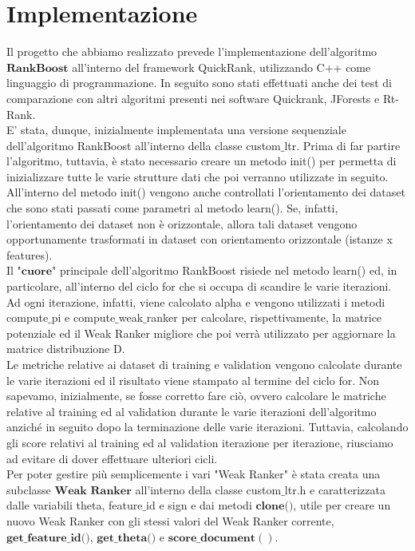 \chapter*{Implementazione}

Il progetto che abbiamo realizzato prevede l'implementazione dell'algoritmo $\textbf{RankBoost}$ all'interno del framework QuickRank, utilizzando C++ come linguaggio di programmazione. In seguito sono stati effettuati anche dei test di comparazione con altri algoritmi presenti nei software Quickrank, JForests e Rt-Rank.\\
E' stata, dunque, inizialmente implementata una versione sequenziale dell'algoritmo RankBoost all'interno della classe custom$\_$ltr. Prima di far partire l'algoritmo, tuttavia, è stato necessario creare un metodo init() per permetta di inizializzare tutte le varie strutture dati che poi verranno utilizzate in seguito. All'interno del metodo init() vengono anche controllati l'orientamento dei dataset che sono stati passati come parametri al metodo learn(). Se, infatti, l'orientamento dei dataset non è orizzontale, allora tali dataset vengono opportunamente trasformati in dataset con orientamento orizzontale (istanze x features).\\
Il "$\textbf{cuore}$" principale dell'algoritmo RankBoost risiede nel metodo learn() ed, in particolare, all'interno del ciclo for che si occupa di scandire le varie iterazioni. Ad ogni iterazione, infatti, viene calcolato alpha e vengono utilizzati i metodi compute$\_$pi e compute$\_$weak$\_$ranker per calcolare, rispettivamente, la matrice potenziale ed il Weak Ranker migliore che poi verrà utilizzato per aggiornare la matrice distribuzione D.\\
Le metriche relative ai dataset di training e validation vengono calcolate durante le varie iterazioni ed il risultato viene stampato al termine del ciclo for. Non sapevamo, inizialmente, se fosse corretto fare ciò, ovvero calcolare le matriche relative al training ed al validation durante le varie iterazioni dell'algoritmo anziché in seguito dopo la terminazione delle varie iterazioni. Tuttavia, calcolando gli score relativi al training ed al validation iterazione per iterazione, riusciamo ad evitare di dover effettuare ulteriori cicli.
\\
Per poter gestire più semplicemente i vari "Weak Ranker" è stata creata una subclasse $\textbf{Weak Ranker}$ all'interno della classe custom$\_$ltr.h e caratterizzata dalle variabili theta, feature$\_$id e sign e dai metodi $\textbf{clone()}$, utile per creare un nuovo Weak Ranker con gli stessi valori del Weak Ranker corrente, $\textbf{get}\_\textbf{feature}\_\textbf{id()}$, $\textbf{get}\_\textbf{theta()}$ e $\textbf{score}\_\textbf{document}()$.\\
